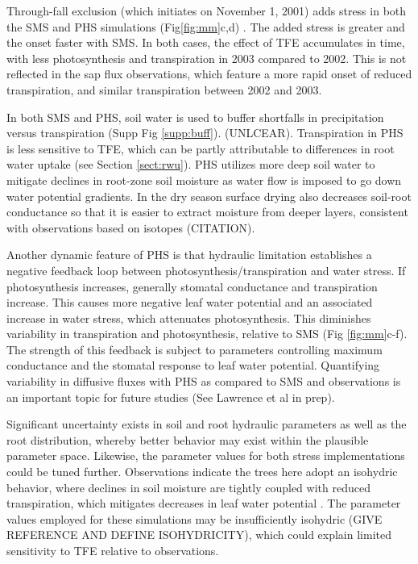 \documentclass[draft,linenumbers]{agujournal}
\begin{document}
    Through-fall exclusion (which initiates on November 1, 2001) adds stress in both the SMS and PHS simulations (Fig\ref{fig:mm}c,d) .
    The added stress is greater and the onset faster with SMS.
    In both cases, the effect of TFE accumulates in time, with less photosynthesis and transpiration in 2003 compared to 2002.
    This is not reflected in the sap flux observations, which feature a more rapid onset of reduced transpiration, and similar transpiration between 2002 and 2003.
    
    In both SMS and PHS, soil water is used to buffer shortfalls in precipitation versus transpiration (Supp Fig \ref{supp:buff}). (UNLCEAR). Transpiration in PHS is less sensitive to TFE, which can be partly attributable to differences in root water uptake (see Section \ref{sect:rwu}).  PHS utilizes more deep soil water to mitigate declines in root-zone soil moisture as water flow is imposed to go down water potential gradients. In the dry season surface drying also decreases soil-root conductance so that it is easier to extract moisture from deeper layers, consistent with observations based on isotopes (CITATION).
    
    Another dynamic feature of PHS is that hydraulic limitation establishes a negative feedback loop between photosynthesis/transpiration and water stress. If photosynthesis increases, generally stomatal conductance and transpiration increase. This causes more negative leaf water potential and an associated increase in water stress, which attenuates photosynthesis. This diminishes variability in transpiration and photosynthesis, relative to SMS (Fig \ref{fig:mm}c-f). The strength of this feedback is subject to parameters controlling maximum conductance and the stomatal response to leaf water potential. Quantifying variability in diffusive fluxes with PHS as compared to SMS and observations is an important topic for future studies (See Lawrence et al in prep).
    
    Significant uncertainty exists in soil and root hydraulic parameters as well as the root distribution, whereby better behavior may exist within the plausible parameter space. Likewise, the parameter values for both stress implementations could be tuned further. Observations indicate the trees here adopt an isohydric behavior, where declines in soil moisture are tightly coupled with reduced transpiration, which mitigates decreases in leaf water potential \citep{fisher2006}. The parameter values employed for these simulations may be insufficiently isohydric (GIVE REFERENCE AND DEFINE ISOHYDRICITY), which could explain limited sensitivity to TFE relative to observations.
    
\end{document}
